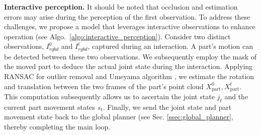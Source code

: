 \noindent\textbf{Interactive perception.} 
It should be noted that occlusion and estimation errors may arise during the perception of the first observation. To address these challenges, we propose a model that leverages interactive observations to enhance operation (see Algo.~\ref{algo:interactive_perception}). Consider two distinct observations, 
$I_{rgbd}^{0}$ and $I_{rgbd}^{t}$, captured during an interaction. A part's motion can be detected between these two observations. We subsequently employ the mask of the moved part to deduce the actual joint state during the interaction. Applying RANSAC \citep{fischler1981random} for outlier removal and Umeyama algorithm \citep{umeyama1991least}, we estimate the rotation and translation between the two frames of the part's point cloud $X_\text{part}^0, X_\text{part}^t$. This computation subsequently allows us to ascertain the joint state
$j_t$ and the current part movement states $s_t$.
Finally, we send the joint state and part movement state back to the global planner (see Sec. \ref{ssec:global_planner}, thereby completing the main loop.


